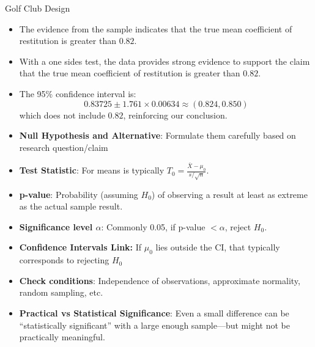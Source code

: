 \documentclass[10pt]{extarticle}
\begin{document}
\begin{examplebox}{Golf Club Design}{}
\begin{enumerate}
        \begin{itemize}
            \item The evidence from the sample indicates that the true mean coefficient of restitution is greater than $0.82$.
            \item With a one sides test, the data provides strong evidence to support the claim that the true mean coefficient of restitution is greater than $0.82$.
            \item The 95\% confidence interval is:
            $$0.83725 \pm 1.761 \times 0.00634 \approx (0.824, 0.850)$$
            which does not include $0.82$, reinforcing our conclusion.
        \end{itemize}
    \end{enumerate}
\end{examplebox}
\begin{takeaway-box}{}{}
    \begin{itemize}
        \item \textbf{Null Hypothesis and Alternative}: Formulate them carefully based on research question/claim
        \item \textbf{Test Statistic}: For means is typically $T_0 = \frac{\bar{X} - \mu_0}{s/\sqrt{n}}$.
        \item \textbf{p-value}: Probability (assuming $H_0$) of observing a result at least as extreme as the actual sample result.
        \item \textbf{Significance level $\alpha$}: Commonly 0.05, if p-value $< \alpha$, reject $H_0$.
        \item \textbf{Confidence Intervals Link:} If $\mu_0$ lies outside the CI, that typically corresponds to rejecting $H_0$
        \item \textbf{Check conditions}: Independence of observations, approximate normality, random sampling, etc.
        \item \textbf{Practical vs Statistical Significance}: Even a small difference can be “statistically significant” with a large enough sample—but might not be practically meaningful.
    \end{itemize}
\end{takeaway-box}
\end{document}
